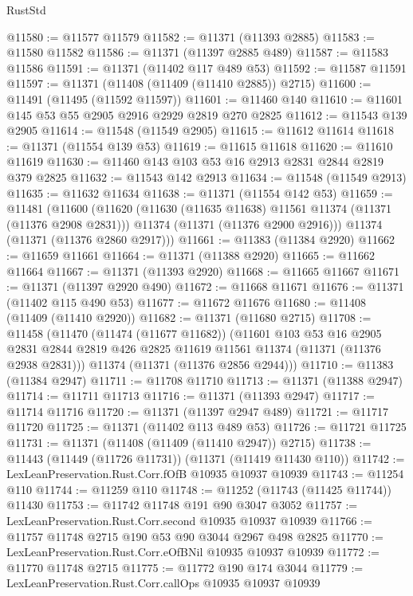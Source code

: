 \begin{lexlean}{RustStd}
\begin{coremodule}
@11580 := @11577 @11579
@11582 := @11371 (@11393 @2885)
@11583 := @11580 @11582
@11586 := @11371 (@11397 @2885 @489)
@11587 := @11583 @11586
@11591 := @11371 (@11402 @117 @489 @53)
@11592 := @11587 @11591
@11597 := @11371 (@11408 (@11409 (@11410 @2885)) @2715)
@11600 := @11491 (@11495 (@11592 @11597))
@11601 := @11460 @140
@11610 := @11601 @145 @53 @55 @2905 @2916 @2929 @2819 @270 @2825
@11612 := @11543 @139 @2905
@11614 := @11548 (@11549 @2905)
@11615 := @11612 @11614
@11618 := @11371 (@11554 @139 @53)
@11619 := @11615 @11618
@11620 := @11610 @11619
@11630 := @11460 @143 @103 @53 @16 @2913 @2831 @2844 @2819 @379 @2825
@11632 := @11543 @142 @2913
@11634 := @11548 (@11549 @2913)
@11635 := @11632 @11634
@11638 := @11371 (@11554 @142 @53)
@11659 := @11481
    (@11600
      (@11620
        (@11630 (@11635 @11638) @11561 @11374 (@11371 (@11376 @2908 @2831)))
        @11374
        (@11371 (@11376 @2900 @2916)))
      @11374
      (@11371 (@11376 @2860 @2917)))
@11661 := @11383 (@11384 @2920)
@11662 := @11659 @11661
@11664 := @11371 (@11388 @2920)
@11665 := @11662 @11664
@11667 := @11371 (@11393 @2920)
@11668 := @11665 @11667
@11671 := @11371 (@11397 @2920 @490)
@11672 := @11668 @11671
@11676 := @11371 (@11402 @115 @490 @53)
@11677 := @11672 @11676
@11680 := @11408 (@11409 (@11410 @2920))
@11682 := @11371 (@11680 @2715)
@11708 := @11458
    (@11470
      (@11474 (@11677 @11682))
      (@11601
        @103
        @53
        @16
        @2905
        @2831
        @2844
        @2819
        @426
        @2825
        @11619
        @11561
        @11374
        (@11371 (@11376 @2938 @2831)))
      @11374
      (@11371 (@11376 @2856 @2944)))
@11710 := @11383 (@11384 @2947)
@11711 := @11708 @11710
@11713 := @11371 (@11388 @2947)
@11714 := @11711 @11713
@11716 := @11371 (@11393 @2947)
@11717 := @11714 @11716
@11720 := @11371 (@11397 @2947 @489)
@11721 := @11717 @11720
@11725 := @11371 (@11402 @113 @489 @53)
@11726 := @11721 @11725
@11731 := @11371 (@11408 (@11409 (@11410 @2947)) @2715)
@11738 := @11443 (@11449 (@11726 @11731)) (@11371 (@11419 @11430 @110))
@11742 := LexLeanPreservation.Rust.Corr.fOfB @10935 @10937 @10939
@11743 := @11254 @110
@11744 := @11259 @110
@11748 := @11252 (@11743 (@11425 @11744)) @11430
@11753 := @11742 @11748 @191 @90 @3047 @3052
@11757 := LexLeanPreservation.Rust.Corr.second @10935 @10937 @10939
@11766 := @11757 @11748 @2715 @190 @53 @90 @3044 @2967 @498 @2825
@11770 := LexLeanPreservation.Rust.Corr.eOfBNil @10935 @10937 @10939
@11772 := @11770 @11748 @2715
@11775 := @11772 @190 @174 @3044
@11779 := LexLeanPreservation.Rust.Corr.callOps @10935 @10937 @10939

\end{coremodule}
\end{lexlean}
